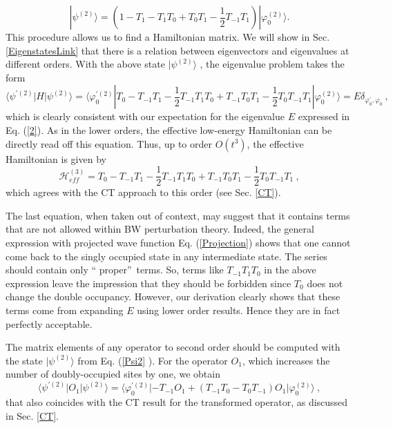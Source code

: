 \documentclass[floatfix,twocolumn,aps,prb,showpacs,superscriptaddress]{revtex4}
\begin{document}
\begin{widetext}
\begin{equation}
|\psi ^{(2)}\rangle =\left( 1-T_{1}-T_{1}T_{0}+T_{0}T_{1}-\frac{1}{2}%
T_{-1}T_{1}\right) |\varphi _{0}^{(2)}\rangle .  \label{Psi2}
\end{equation}%
This procedure allows us to find a Hamiltonian matrix. We will show in Sec. %
\ref{EigenstatesLink} that there is a relation between eigenvectors and
eigenvalues at different orders. With the above state $|\psi ^{(2)}\rangle $%
, the eigenvalue problem takes the form
\begin{equation}
\langle \psi ^{\prime (2)}|H|\psi ^{(2)}\rangle =\langle \varphi
_{0}^{\prime (2)}|T_{0}-T_{-1}T_{1}-\frac{1}{2}%
T_{-1}T_{1}T_{0}+T_{-1}T_{0}T_{1}-\frac{1}{2}T_{0}T_{-1}T_{1}|\varphi
_{0}^{(2)}\rangle =E\delta _{\varphi _{0}^{\prime },\varphi _{0}} \ ,
\label{Eigenequation2}
\end{equation}%
%
%
%
%
which is clearly consistent with our expectation for the eigenvalue $E$
expressed in Eq. (\ref{2}). As in the lower orders, the effective low-energy
Hamiltonian can be directly read off this equation. Thus, up to order $%
O(t^{3})$, the effective Hamiltonian is given by
\begin{equation}
\mathcal{H}_{eff}^{(3)}=T_{0}-T_{-1}T_{1}-\frac{1}{2}%
T_{-1}T_{1}T_{0}+T_{-1}T_{0}T_{1}-\frac{1}{2}T_{0}T_{-1}T_{1}\ ,  \label{Heff3}
\end{equation}%
which agrees with the CT approach to this order (see Sec. \ref{CT}).


The last equation, when taken out of context, may suggest that it contains
terms that are not allowed within BW perturbation theory. Indeed, the
general expression with projected wave function Eq. (\ref{Projection}) shows
that one cannot come back to the singly occupied state in any intermediate
state. The series should contain only \textquotedblleft
proper\textquotedblright\ terms. So, terms like $T_{-1}T_{1}T_{0}$ in the
above expression leave the impression that they should be forbidden since $%
T_{0}$ does not change the double occupancy. However, our derivation clearly
shows that these terms come from expanding $E$ using lower order results.
Hence they are in fact perfectly acceptable.


The matrix elements of any operator to second order
should be computed with the state $|\psi ^{(2)}\rangle $ from Eq. (\ref{Psi2}%
). For the operator $O_{1}$, which increases the number of doubly-occupied
sites by one, we obtain
\begin{equation}
\langle \psi ^{\prime (2)}|O_{1}|\psi ^{(2)}\rangle =\langle \varphi
_{0}^{\prime (2)}|-T_{-1}O_{1}+(T_{-1}T_{0}-T_{0}T_{-1})O_{1}|\varphi
_{0}^{(2)}\rangle\ ,  \label{O_2}
\end{equation}%
that also coincides with the CT result for the transformed operator, as
discussed in Sec. \ref{CT}.



\end{widetext}
\end{document}
